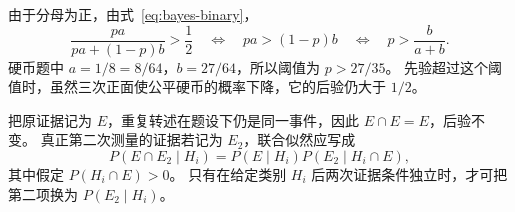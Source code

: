 \documentclass[UTF8,12pt,a4paper,fontset=fandol]{ctexart}
\begin{document}
\begin{solve}
由于分母为正，由式~\eqref{eq:bayes-binary}，
\[
  \frac{pa}{pa+(1-p)b}>\frac12
  \quad\Longleftrightarrow\quad pa>(1-p)b
  \quad\Longleftrightarrow\quad p>\frac{b}{a+b}.
\]
硬币题中 $a=1/8=8/64$，$b=27/64$，所以阈值为 $p>27/35$。
先验超过这个阈值时，虽然三次正面使公平硬币的概率下降，它的后验仍大于 $1/2$。
\end{solve}

\begin{solve}
把原证据记为 $E$，重复转述在题设下仍是同一事件，因此 $E\cap E=E$，后验不变。
真正第二次测量的证据若记为 $E_2$，联合似然应写成
\[
  P(E\cap E_2\mid H_i)
  =P(E\mid H_i)P(E_2\mid H_i\cap E),
\]
其中假定 $P(H_i\cap E)>0$。
只有在给定类别 $H_i$ 后两次证据条件独立时，才可把第二项换为 $P(E_2\mid H_i)$。
\end{solve}
\end{document}
